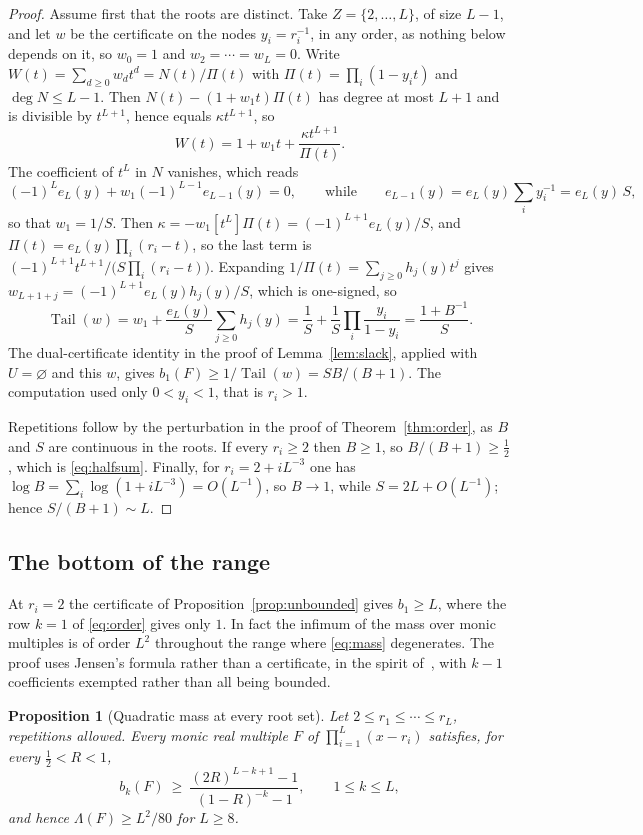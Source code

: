\documentclass[11pt]{article}
\newtheorem{proposition}[theorem]{Proposition}
\DeclareMathOperator{\Tail}{Tail}
\begin{document}
\begin{proof}
Assume first that the roots are distinct.  Take $Z=\{2,\ldots,L\}$, of size
$L-1$, and let $w$ be the certificate on the
nodes $y_i=r_i^{-1}$, in any order, as nothing below depends on it, so $w_0=1$ and $w_2=\cdots=w_L=0$.  Write
$W(t)=\sum_{d\ge0}w_dt^d=N(t)/\Pi(t)$ with $\Pi(t)=\prod_i(1-y_it)$ and
$\deg N\le L-1$.  Then $N(t)-(1+w_1t)\Pi(t)$ has degree at most $L+1$ and is
divisible by $t^{L+1}$, hence equals $\kappa t^{L+1}$, so
\[
  W(t)=1+w_1t+\frac{\kappa t^{L+1}}{\Pi(t)} .
\]
The coefficient of $t^L$ in $N$ vanishes, which reads
\[
  (-1)^Le_L(y)+w_1(-1)^{L-1}e_{L-1}(y)=0,
  \qquad\text{while}\qquad
  e_{L-1}(y)=e_L(y)\sum_{i}y_i^{-1}=e_L(y)\,S,
\]
so that $w_1=1/S$.  Then
$\kappa=-w_1[t^L]\Pi(t)=(-1)^{L+1}e_L(y)/S$, and $\Pi(t)=e_L(y)\prod_i(r_i-t)$,
so the last term is $(-1)^{L+1}t^{L+1}/\bigl(S\prod_i(r_i-t)\bigr)$.
Expanding $1/\Pi(t)=\sum_{j\ge0}h_j(y)t^j$ gives
$w_{L+1+j}=(-1)^{L+1}e_L(y)h_j(y)/S$, which is one-signed, so
\[
  \Tail(w)=w_1+\frac{e_L(y)}S\sum_{j\ge0}h_j(y)
  =\frac1S+\frac1S\prod_{i}\frac{y_i}{1-y_i}
  =\frac{1+B^{-1}}S .
\]
The dual-certificate identity in the proof of Lemma~\ref{lem:slack}, applied
with $U=\varnothing$ and this $w$, gives $b_1(F)\ge1/\Tail(w)=SB/(B+1)$.  The
computation used only $0<y_i<1$, that is $r_i>1$.

Repetitions follow by the perturbation in the proof of
Theorem~\ref{thm:order}, as $B$ and $S$ are continuous in the roots.  If
every $r_i\ge2$ then $B\ge1$, so $B/(B+1)\ge\tfrac12$, which is
\eqref{eq:halfsum}.  Finally, for $r_i=2+iL^{-3}$ one has
$\log B=\sum_i\log(1+iL^{-3})=O(L^{-1})$, so $B\to1$, while
$S=2L+O(L^{-1})$; hence $S/(B+1)\sim L$.
\end{proof}

\subsection{The bottom of the range}\label{sec:bottom}

At $r_i=2$ the certificate of Proposition~\ref{prop:unbounded} gives
$b_1\ge L$, where the row $k=1$ of \eqref{eq:order} gives only $1$.  In fact
the infimum of the mass over monic multiples is of order $L^2$
throughout the range where \eqref{eq:mass} degenerates.  The proof uses
Jensen's formula rather than a certificate, in the spirit
of~\cite{bbbp-multiple,bbbp-ray}, with $k-1$ coefficients exempted rather
than all being bounded.

\begin{proposition}[Quadratic mass at every root set]
\label{prop:quadratic}
Let $2\le r_1\le\cdots\le r_L$, repetitions allowed.  Every monic real
multiple $F$ of $\prod_{i=1}^L(x-r_i)$ satisfies, for every
$\tfrac12<R<1$,
\begin{equation}\label{eq:jensen}
  b_k(F)\ \ge\ \frac{(2R)^{L-k+1}-1}{(1-R)^{-k}-1},\qquad 1\le k\le L,
\end{equation}
and hence $\Lambda(F)\ge L^2/80$ for $L\ge8$.
\end{proposition}
\end{document}
